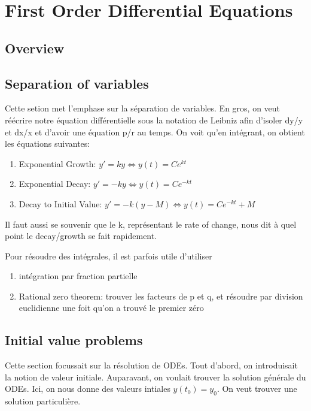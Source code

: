 \documentclass{article}
\begin{document}
\pagebreak
\section{First Order Differential Equations}
\subsection*{Overview}

\subsection{Separation of variables}

Cette setion met l'emphase sur la séparation de variables. En gros, on
veut réécrire notre équation différentielle sous la notation de Leibniz
afin d'isoler dy/y et dx/x et d'avoir une équation p/r au temps. On voit
qu'en intégrant, on obtient les équations suivantes:
\begin{enumerate}
    \item Exponential Growth: $ y' = ky \Longleftrightarrow y(t) = C e^{kt} $
    \item Exponential Decay: $ y' = -ky \Longleftrightarrow y(t) = C e^{-kt} $
    \item Decay to Initial Value: $ y' = -k (y-M) \Longleftrightarrow
	y(t) = C e^{-kt} + M $
\end{enumerate}

Il faut aussi se souvenir que le k, représentant le rate of change, nous
dit à quel point le decay/growth se fait rapidement.

\begin{remark}
    Pour résoudre des intégrales, il est parfois utile d'utiliser
    \begin{enumerate}
        \item intégration par fraction partielle
	\item Rational zero theorem: trouver les facteurs de p et q, et
	    résoudre par division euclidienne une foit qu'on a trouvé le
	    premier zéro
    \end{enumerate}
\end{remark}

\subsection{Initial value problems}

Cette section focussait sur la résolution de ODEs. Tout d'abord, on
introduisait la notion de valeur initiale. Auparavant, on voulait
trouver la solution générale du ODEs. Ici, on nous donne des valeurs
intiales $ y(t_0) = y_0 $. On veut trouver une solution particulière.
\end{document}
